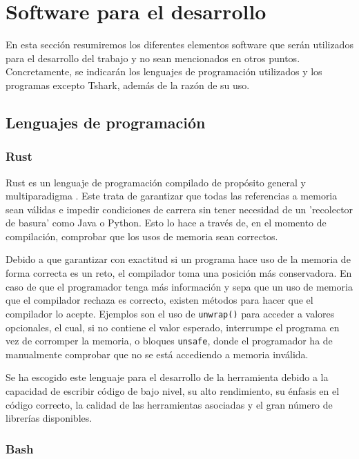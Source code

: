 \section{Software para el desarrollo}

En esta sección resumiremos los diferentes elementos software que serán utilizados para el desarrollo del trabajo y no sean mencionados en otros puntos. Concretamente, se indicarán los lenguajes de programación utilizados y los programas excepto Tshark, además de la razón de su uso.

\subsection{Lenguajes de programación}

\subsubsection{Rust}

Rust es un lenguaje de programación compilado de propósito general y multiparadigma \cite{blandy2017programming} \cite{klabnik2018rust}. Este trata de garantizar que todas las referencias a memoria sean válidas e impedir condiciones de carrera sin tener necesidad de un 'recolector de basura' como Java o Python. Esto lo hace a través de, en el momento de compilación, comprobar que los usos de memoria sean correctos. 

Debido a que garantizar con exactitud si un programa hace uso de la memoria de forma correcta es un reto, el compilador toma una posición más conservadora. En caso de que el programador tenga más información y sepa que un uso de memoria que el compilador rechaza es correcto, existen métodos para hacer que el compilador lo acepte. Ejemplos son el uso de \texttt{unwrap()} para acceder a valores opcionales, el cual, si no contiene el valor esperado, interrumpe el programa en vez de corromper la memoria, o bloques \texttt{unsafe}, donde el programador ha de manualmente comprobar que no se está accediendo a memoria inválida.

Se ha escogido este lenguaje para el desarrollo de la herramienta debido a la capacidad de escribir código de bajo nivel, su alto rendimiento, su énfasis en el código correcto, la calidad de las herramientas asociadas y el gran número de librerías disponibles. 

\subsubsection{Bash}

